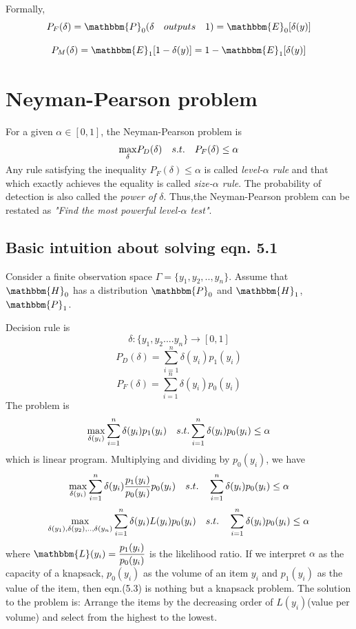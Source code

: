 \documentclass[12pt]{report}
\begin{document}
Formally, $$P_F(\delta)=\mathbbm{P}_0(\delta\quad outputs\quad 1)=\mathbbm{E}_0[\delta(y)]$$

$$P_M(\delta)=\mathbbm{E}_1[1-\delta(y)]=1-\mathbbm{E}_1[\delta(y)]$$



\section{Neyman-Pearson problem}
For a given $\alpha \in [0,1]$, the Neyman-Pearson problem is
\begin{equation}
\smash{\displaystyle\max_\delta} P_D(\delta) \quad s.t. \quad P_F(\delta)\leq\alpha
\end{equation}
Any rule satisfying the inequality $P_F(\delta)\leq \alpha $ is called {\itshape level-$\alpha$ rule} and that which exactly achieves the equality is called {\itshape size-$\alpha$ rule}. The probability of detection is also called the {\itshape power of $\delta$}. Thus,the Neyman-Pearson problem can be restated as {\itshape "Find the most powerful level-$\alpha$ test"}.
\subsection{Basic intuition about solving eqn. 5.1}
Consider a finite observation space $\Gamma=\{y_1,y_2,..,y_n\}$. Assume that $\mathbbm{H}_0$ has a distribution $\mathbbm{P}_0$ and $\mathbbm{H}_1$, $\mathbbm{P}_1$. 

Decision rule is
$$\delta\colon\{y_1,y_2....y_n\}\rightarrow[0,1]$$
$$P_D(\delta)=\sum\limits_{i=1}^n\delta(y_i){p}_1(y_i)$$
$$P_F(\delta)=\sum\limits_{i=1}^n\delta(y_i){p}_0(y_i)$$
The problem is 
\begin{equation}
\smash{\displaystyle\max_{\delta(y_i)}} \sum\limits_{i=1}^n\delta(y_i)p_1(y_i) \quad s.t. \sum\limits_{i=1}^n\delta(y_i){p}_0(y_i)\leq\alpha
\end{equation}
which is linear program. Multiplying and dividing by $p_0(y_i)$, we have $$\smash{\displaystyle\max_{\delta(y_i)}}\sum\limits_{i=1}^n\delta(y_i)\dfrac{p_1(y_i)}{p_0(y_i)}p_0(y_i)\quad s.t.\quad  \sum\limits_{i=1}^n\delta(y_i)p_0(y_i) \leq\alpha$$
\begin{equation}
\smash{\displaystyle\max_{\delta(y_1),\delta(y_2),..,\delta(y_n)}}\sum\limits_{i=1}^n\delta(y_i) L(y_i)p_0(y_i)\quad s.t. \quad \sum\limits_{i=1}^n\delta(y_i)p_0(y_i) \leq\alpha
\end{equation}
where $\mathbbm{L}(y_i)=\dfrac{p_1(y_i)}{p_0(y_i)}$ is the likelihood ratio.
If we interpret $\alpha$ as the capacity of a knapsack, $p_0(y_i)$ as the volume of an item $y_i$ and $p_1(y_i)$ as the value of the item, then eqn.(5.3) is nothing but a knapsack problem. The solution to the problem is: Arrange the items by the decreasing order of $L(y_i)$(value per volume) and select from the highest to the lowest.
\end{document}
